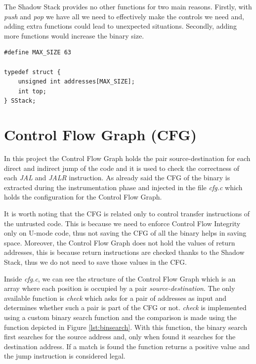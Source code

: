 The Shadow Stack provides no other functions for two main reasons. Firstly, with
\textit{push} and \textit{pop} we have all we need to effectively make the
controls we need and, adding extra functions could lead to unexpected situations.
Secondly, adding more functions would increase the binary size.

\begin{lstlisting}[style=CStyle, caption = Shadow Stack definition, label={lst:ss}]
#define MAX_SIZE 63

typedef struct {
    unsigned int addresses[MAX_SIZE];
    int top;
} SStack;
\end{lstlisting}

\section{Control Flow Graph (CFG)}
\label{sec:project_cfg}

In this project the Control Flow Graph holds the pair source-destination for each
direct and indirect jump of the code and it is used to check the correctness of each
\textit{JAL} and \textit{JALR} instruction. As already said the CFG of the
binary is extracted during the instrumentation phase and injected in the file
\textit{cfg.c} which holds the configuration for the Control Flow Graph.

It is worth noting that the CFG is related only to control transfer instructions
of the untrusted code. This is because we need to enforce Control Flow Integrity
only on U-mode code, thus not saving the CFG of all the binary helps in saving space.
Moreover, the Control Flow Graph does not hold the values of return addresses,
this is because return instructions are checked thanks to the Shadow Stack, thus
we do not need to save those values in the CFG.

Inside \textit{cfg.c}, we can see the structure of the Control Flow Graph which is
an array where each position is occupied by a pair \textit{source-destination}. The
only available function is \textit{check} which asks for a pair of addresses as
input and determines whether such a pair is part of the CFG or not. \textit{check}
is implemented using a custom binary search function and the comparison is made
using the function depicted in Figure \ref{lst:binsearch}. With this function,
the binary search first searches for the source address and, only when found it searches
for the destination address. If a match is found the function returns a positive
value and the jump instruction is considered legal.

